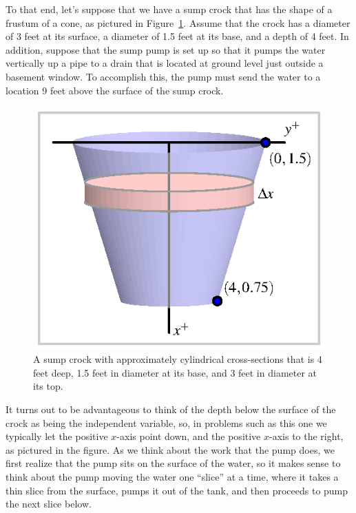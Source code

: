 To that end, let's suppose that we have a sump crock that has the shape of a frustum of a cone, as pictured in Figure~\ref{F:6.4.Crock}.  Assume that the crock has a diameter of 3 feet at its surface, a diameter of 1.5 feet at its base, and a depth of 4 feet.  In addition, suppose that the sump pump is set up so that it pumps the water vertically up a pipe to a drain that is located at ground level just outside a basement window.  To accomplish this, the pump must send the water to a location 9 feet above the surface of the sump crock.

\begin{figure}[h]
\begin{center}
\includegraphics{figures/6_4_Crock.eps}
\caption{A sump crock with approximately cylindrical cross-sections that is 4 feet deep, 1.5 feet in diameter at its base, and 3 feet in diameter at its top.} \label{F:6.4.Crock}
\end{center}
\end{figure}

It turns out to be advantageous to think of the depth below the surface of the crock as being the independent variable, so, in problems such as this one we typically let the positive $x$-axis point down, and the positive $x$-axis to the right, as pictured in the figure.  As we think about the work that the pump does, we first realize that the pump sits on the surface of the water, so it makes sense to think about the pump moving the water one ``slice'' at a time, where it takes a thin slice from the surface, pumps it out of the tank, and then proceeds to pump the next slice below.

